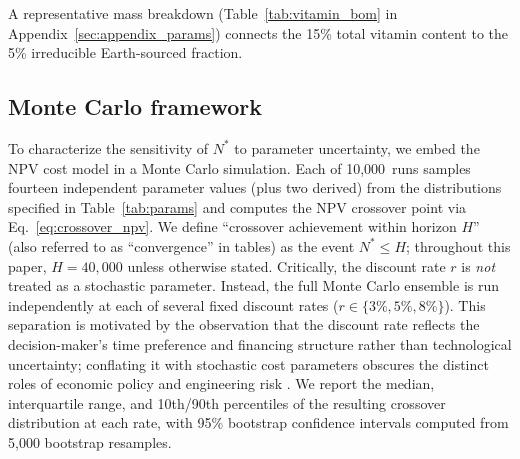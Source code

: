 \documentclass[preprint,12pt]{elsarticle}
\begin{document}
A representative mass breakdown (Table~\ref{tab:vitamin_bom} in Appendix~\ref{sec:appendix_params}) connects the 15\% total vitamin content to the 5\% irreducible Earth-sourced fraction.

\subsection{Monte Carlo framework}

To characterize the sensitivity of $N^*$ to parameter uncertainty, we embed the NPV cost model in a Monte Carlo simulation. Each of 10{,}000~runs samples fourteen independent parameter values (plus two derived) from the distributions specified in Table~\ref{tab:params} and computes the NPV crossover point via Eq.~\ref{eq:crossover_npv}. We define ``crossover achievement within horizon $H$'' (also referred to as ``convergence'' in tables) as the event $N^* \leq H$; throughout this paper, $H = 40{,}000$ unless otherwise stated. Critically, the discount rate $r$ is \emph{not} treated as a stochastic parameter. Instead, the full Monte Carlo ensemble is run independently at each of several fixed discount rates ($r \in \{3\%, 5\%, 8\%\}$). This separation is motivated by the observation that the discount rate reflects the decision-maker's time preference and financing structure rather than technological uncertainty; conflating it with stochastic cost parameters obscures the distinct roles of economic policy and engineering risk \cite{arrow2014}. We report the median, interquartile range, and 10th/90th percentiles of the resulting crossover distribution at each rate, with 95\% bootstrap confidence intervals computed from 5{,}000 bootstrap resamples.
\end{document}
